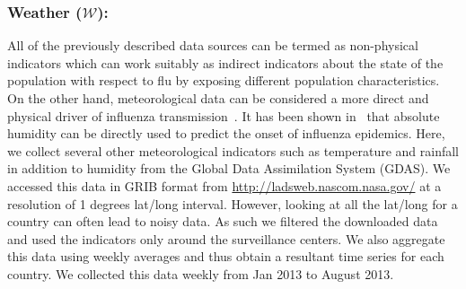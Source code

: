 \subsubsection{Weather ($\mathcal{W}$):}
All of the previously described data sources can
be termed as non-physical indicators which can work suitably as
indirect
indicators about the state of the population with respect to flu by exposing
different population characteristics. 
On the other hand, meteorological data can
be considered a more direct and physical driver of 
influenza transmission~\cite{flu_humidity_physical}. It 
has been shown in~\cite{Shaman_orig_humidity_link, Shaman_humidity_USA, ref9}
that absolute humidity can be directly used to predict the onset of influenza
epidemics. Here, we collect several other meteorological indicators such as
temperature and rainfall in addition to humidity from the Global Data
Assimilation System (GDAS).
We accessed this data in GRIB format from 
\url{http://ladsweb.nascom.nasa.gov/} at a resolution of 1 
degrees lat/long interval. However, looking
at all the lat/long for a country can often lead to noisy data.
As such we filtered the downloaded data and used the indicators 
only around the surveillance centers.
We also
aggregate this data using weekly averages and thus obtain a resultant time series
for each country. We collected this data weekly from Jan 2013 to August 2013. 

